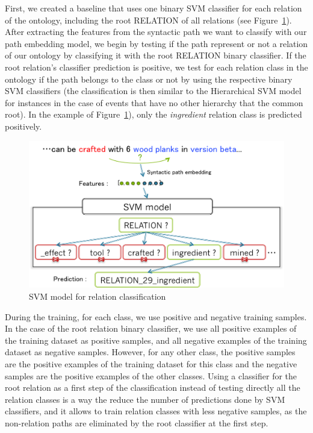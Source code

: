 \documentclass[12pt]{article}
\begin{document}
First, we created a baseline that uses one binary SVM classifier for each relation of the ontology, including the root RELATION of all relations (see Figure~\ref{relationClassificationBaseline}).
After extracting the features from the syntactic path we want to classify with our path embedding model, we begin by testing if the path represent or not a relation of our ontology by classifying it with the root RELATION binary classifier. If the root relation's classifier prediction is positive, we test for each relation class in the ontology if the path belongs to the class or not by using the respective binary SVM classifiers (the classification is then similar to the Hierarchical SVM model for instances in the case of events that have no other hierarchy that the common root). In the example of Figure~\ref{relationClassificationBaseline}), only the \textit{ingredient} relation class is predicted positively.

\begin{figure}[!ht]
   \centering \includegraphics[width=0.7\linewidth]{Figures/Semantic_Parsing/relationClassificationBaseline.png}
   \caption{\label{relationClassificationBaseline} SVM model for relation classification}
\end{figure}

During the training, for each class, we use positive and negative training samples. In the case of the root relation binary classifier, we use all positive examples of the training dataset as positive samples, and all negative examples of the training dataset as negative samples. However, for any other class, the positive samples are the positive examples of the training dataset for this class and the negative samples are the positive examples of the other classes. Using a classifier for the root relation as a first step of the classification instead of testing directly all the relation classes is a way the reduce the number of predictions done by SVM classifiers, and it allows to train relation classes with less negative samples, as the non-relation paths are eliminated by the root classifier at the first step.
\end{document}
